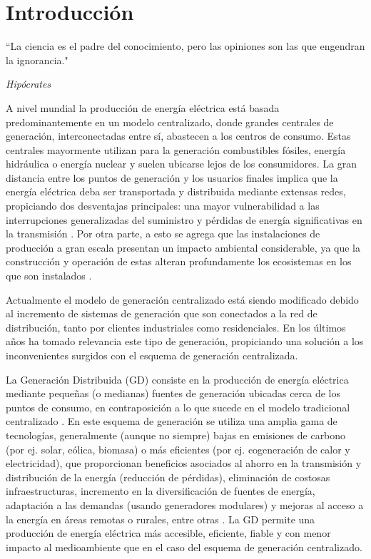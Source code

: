 \cleardoublepage
\chapter{Introducción}
\label{cap:Introduccion}

\epigraph{``La ciencia es el padre del conocimiento, pero las opiniones son las que engendran la ignorancia."}{\textit{Hipócrates}}

A nivel mundial la producción de energía eléctrica está basada predominantemente en un modelo centralizado, donde grandes centrales de generación, interconectadas entre sí, abastecen a los centros de consumo. Estas centrales mayormente utilizan para la generación combustibles fósiles, energía hidráulica o energía nuclear y suelen ubicarse lejos de los consumidores. La gran distancia entre los puntos de generación y los usuarios finales implica que la energía eléctrica deba ser transportada y distribuida mediante extensas redes, propiciando dos desventajas principales: una mayor vulnerabilidad a las interrupciones generalizadas del suministro y pérdidas de energía significativas en la transmisión \cite{Mehigan2018}. Por otra parte, a esto se agrega que las instalaciones de producción a gran escala presentan un impacto ambiental considerable, ya que la construcción y operación de estas alteran profundamente los ecosistemas en los que son instalados \cite{Olivera2010}.

Actualmente el modelo de generación centralizado está siendo modificado debido al incremento de sistemas de generación que son conectados a la red de distribución, tanto por clientes industriales como residenciales. En los últimos años ha tomado relevancia este tipo de generación, propiciando una solución a los inconvenientes surgidos con el esquema de generación centralizada.

La Generación Distribuida (GD) consiste en la producción de energía eléctrica mediante pequeñas (o medianas) fuentes de generación ubicadas cerca de los puntos de consumo, en contraposición a lo que sucede en el modelo tradicional centralizado \cite{Shaukat2023}. En este esquema de generación se utiliza una amplia gama de tecnologías, generalmente (aunque no siempre) bajas en emisiones de carbono (por ej. solar, eólica, biomasa) o más eficientes (por ej. cogeneración de calor y electricidad), que proporcionan beneficios asociados al ahorro en la transmisión y distribución de la energía (reducción de pérdidas), eliminación de costosas infraestructuras, incremento en la diversificación de fuentes de energía, adaptación a las demandas (usando generadores modulares) y mejoras al acceso a la energía en áreas remotas o rurales, entre otras \cite{Allan2015}. La GD permite una producción de energía eléctrica más accesible, eficiente, fiable y con menor impacto al medioambiente que en el caso del esquema de generación centralizado.

